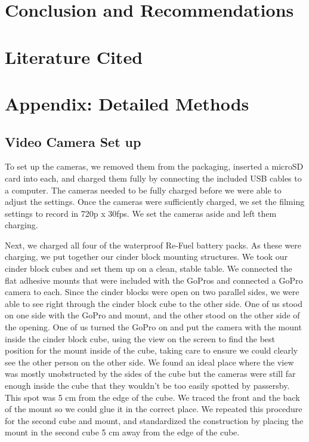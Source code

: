 \documentclass{article}\usepackage[]{graphicx}\usepackage[]{color}
\begin{document}
\section{Conclusion and Recommendations}


\section{Literature Cited}




\newpage
\section{Appendix: Detailed Methods}

\subsection{Video Camera Set up}

To set up the cameras, we removed them from the packaging, inserted a microSD card into each, and charged them fully by connecting the included USB cables to a computer. The cameras needed to be fully charged before we were able to adjust the settings. Once the cameras were sufficiently charged, we set the filming settings to record in 720p x 30fps. We set the cameras aside and left them charging. 

Next, we charged all four of the waterproof Re-Fuel battery packs. As these were charging, we put together our cinder block mounting structures. We took our cinder block cubes and set them up on a clean, stable table. We connected the flat adhesive mounts that were included with the GoPros and connected a GoPro camera to each. Since the cinder blocks were open on two parallel sides, we were able to see right through the cinder block cube to the other side. One of us stood on one side with the GoPro and mount, and the other stood on the other side of the opening. One of us turned the GoPro on and put the camera with the mount inside the cinder block cube, using the view on the screen to find the best position for the mount inside of the cube, taking care to ensure we could clearly see the other person on the other side. We found an ideal place where the view was mostly unobstructed by the sides of the cube but the cameras were still far enough inside the cube that they wouldn't be too easily spotted by passersby. This spot was 5 cm from the edge of the cube. We traced the front and the back of the mount so we could glue it in the correct place. We repeated this procedure for the second cube and mount, and standardized the construction by placing the mount in the second cube 5 cm away from the edge of the cube. 
\end{document}
